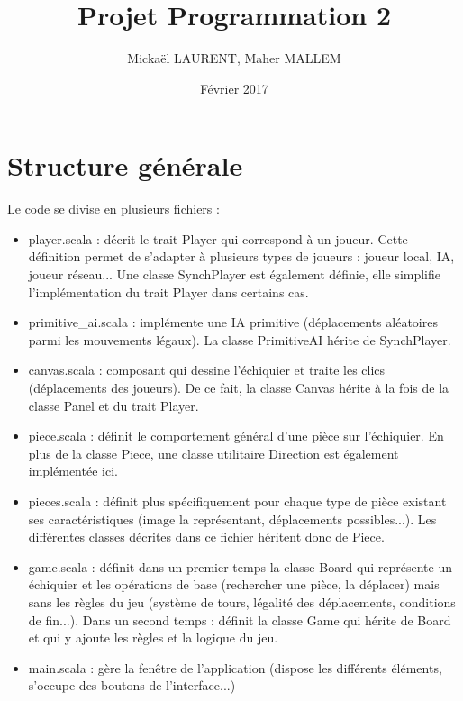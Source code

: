 \documentclass[11pt]{article}
\title{Projet Programmation 2}
\author{Mickaël LAURENT, Maher MALLEM}
\date{Février 2017}
\begin{document}
\renewcommand{\labelitemi}{-}
\maketitle

\section{Structure générale}

Le code se divise en plusieurs fichiers :\newline
\begin{itemize}
\item player.scala : décrit le trait Player qui correspond à un joueur. Cette définition permet de s'adapter à plusieurs types de joueurs : joueur local, IA, joueur réseau... Une classe SynchPlayer est également définie, elle simplifie l'implémentation du trait Player dans certains cas.\newline

\item primitive\_ai.scala : implémente une IA primitive (déplacements aléatoires parmi les mouvements légaux). La classe PrimitiveAI hérite de SynchPlayer.\newline

\item canvas.scala : composant qui dessine l'échiquier et traite les clics (déplacements des joueurs). De ce fait, la classe Canvas hérite à la fois de la classe Panel et du trait Player.\newline

\item piece.scala : définit le comportement général d'une pièce sur l'échiquier. En plus de la classe Piece, une classe utilitaire Direction est également implémentée ici.\newline

\item pieces.scala : définit plus spécifiquement pour chaque type de pièce existant ses caractéristiques (image la représentant, déplacements possibles...). Les différentes classes décrites dans ce fichier héritent donc de Piece.\newline

\item game.scala : définit dans un premier temps la classe Board qui représente un échiquier et les opérations de base (rechercher une pièce, la déplacer) mais sans les règles du jeu (système de tours, légalité des déplacements, conditions de fin...). Dans un second temps : définit la classe Game qui hérite de Board et qui y ajoute les règles et la logique du jeu.\newline

\item main.scala : gère la fenêtre de l'application (dispose les différents éléments, s'occupe des boutons de l'interface...)
\end{itemize}
\-
\end{document}
